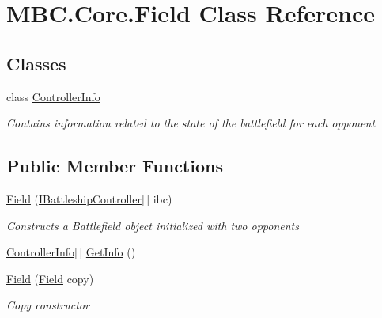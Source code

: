 \hypertarget{class_m_b_c_1_1_core_1_1_field}{\section{M\-B\-C.\-Core.\-Field Class Reference}
\label{class_m_b_c_1_1_core_1_1_field}
}
\subsection*{Classes}
\begin{DoxyCompactItemize}
\item 
class \hyperlink{class_m_b_c_1_1_core_1_1_field_1_1_controller_info}{Controller\-Info}
\begin{DoxyCompactList}\small\item\em Contains information related to the state of the battlefield for each opponent\end{DoxyCompactList}\end{DoxyCompactItemize}
\subsection*{Public Member Functions}
\begin{DoxyCompactItemize}
\item 
\hypertarget{class_m_b_c_1_1_core_1_1_field_a7310ab93b09a8cd557e4fdcc3f686a78}{\hyperlink{class_m_b_c_1_1_core_1_1_field_a7310ab93b09a8cd557e4fdcc3f686a78}{Field} (\hyperlink{interface_m_b_c_1_1_core_1_1_i_battleship_controller}{I\-Battleship\-Controller}\mbox{[}$\,$\mbox{]} ibc)}\label{class_m_b_c_1_1_core_1_1_field_a7310ab93b09a8cd557e4fdcc3f686a78}

\begin{DoxyCompactList}\small\item\em Constructs a Battlefield object initialized with two opponents\end{DoxyCompactList}\item 
\hyperlink{class_m_b_c_1_1_core_1_1_field_1_1_controller_info}{Controller\-Info}\mbox{[}$\,$\mbox{]} \hyperlink{class_m_b_c_1_1_core_1_1_field_aaf565a96cdff422ffed99cccb64b400a}{Get\-Info} ()
\item 
\hypertarget{class_m_b_c_1_1_core_1_1_field_a48bb106fc9697c3a8bd7139d06f4aa09}{\hyperlink{class_m_b_c_1_1_core_1_1_field_a48bb106fc9697c3a8bd7139d06f4aa09}{Field} (\hyperlink{class_m_b_c_1_1_core_1_1_field}{Field} copy)}\label{class_m_b_c_1_1_core_1_1_field_a48bb106fc9697c3a8bd7139d06f4aa09}

\begin{DoxyCompactList}\small\item\em Copy constructor\end{DoxyCompactList}\end{DoxyCompactItemize}
